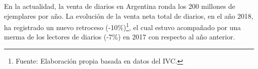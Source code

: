 En la actualidad, la venta de diarios en Argentina ronda los 200 millones de ejemplares por año. La evolución de la venta neta total de diarios, en el año 2018, ha registrado un nuevo retroceso (-10\%)\footnote{Fuente: Elaboración propia basada en datos del IVC.}, el cual estuvo acompañado por una merma de los lectores de diarios (-7\%) en 2017 con respecto al año anterior.

%
